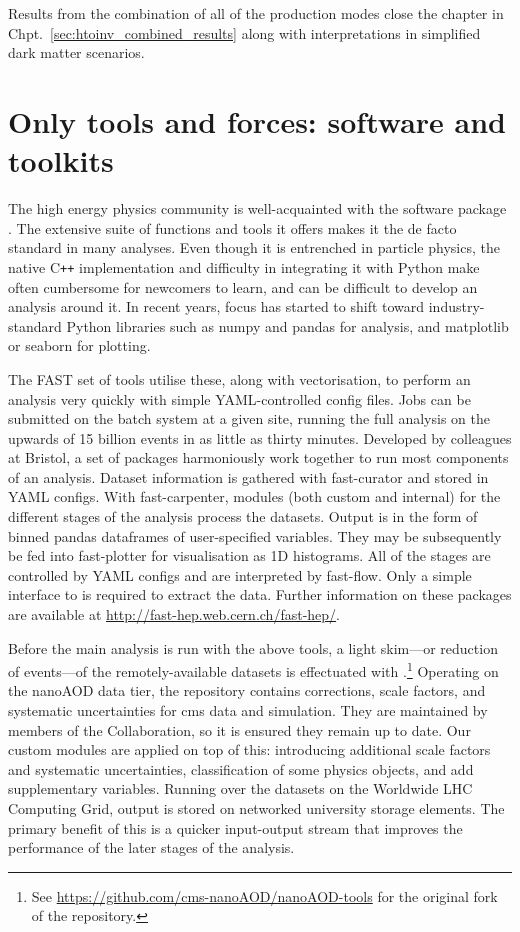 Results from the combination of all of the production modes close the chapter in Chpt.~\ref{sec:htoinv_combined_results} along with interpretations in simplified dark matter scenarios.




\section{Only tools and forces: software and toolkits}
\label{sec:htoinv_software}

The high energy physics community is well-acquainted with the software package \ROOT. The extensive suite of functions and tools it offers makes it the de facto standard in many analyses. Even though it is entrenched in particle physics, the native C\texttt{++} implementation and difficulty in integrating it with Python make \ROOT often cumbersome for newcomers to learn, and can be difficult to develop an analysis around it. In recent years, focus has started to shift toward industry-standard Python libraries such as \textsf{numpy} and \textsf{pandas} for analysis, and \textsf{matplotlib} or \textsf{seaborn} for plotting.

The FAST set of tools utilise these, along with vectorisation, to perform an analysis very quickly with simple YAML-controlled config files. Jobs can be submitted on the batch system at a given site, running the full analysis on the upwards of 15 billion events in as little as thirty minutes. Developed by colleagues at Bristol, a set of packages harmoniously work together to run most components of an analysis. Dataset information is gathered with \textsf{fast-curator} and stored in YAML configs. With \textsf{fast-carpenter}, modules (both custom and internal) for the different stages of the analysis process the datasets. Output is in the form of binned \textsf{pandas} dataframes of user-specified variables. They may be subsequently be fed into \textsf{fast-plotter} for visualisation as 1D histograms. All of the stages are controlled by YAML configs and are interpreted by \textsf{fast-flow}. Only a simple interface to \ROOT is required to extract the data. Further information on these packages are available at \url{http://fast-hep.web.cern.ch/fast-hep/}.

Before the main analysis is run with the above tools, a light skim---or reduction of events---of the remotely-available datasets is effectuated with \nanoAODtools.\footnote{See \url{https://github.com/cms-nanoAOD/nanoAOD-tools} for the original fork of the repository.} Operating on the nanoAOD data tier, the repository contains corrections, scale factors, and systematic uncertainties for \acrshort{cms} data and simulation. They are maintained by members of the Collaboration, so it is ensured they remain up to date. Our custom modules are applied on top of this: introducing additional scale factors and systematic uncertainties, classification of some physics objects, and add supplementary variables. Running over the datasets on the Worldwide LHC Computing Grid, output is stored on networked university storage elements. The primary benefit of this is a quicker input-output stream that improves the performance of the later stages of the analysis.
